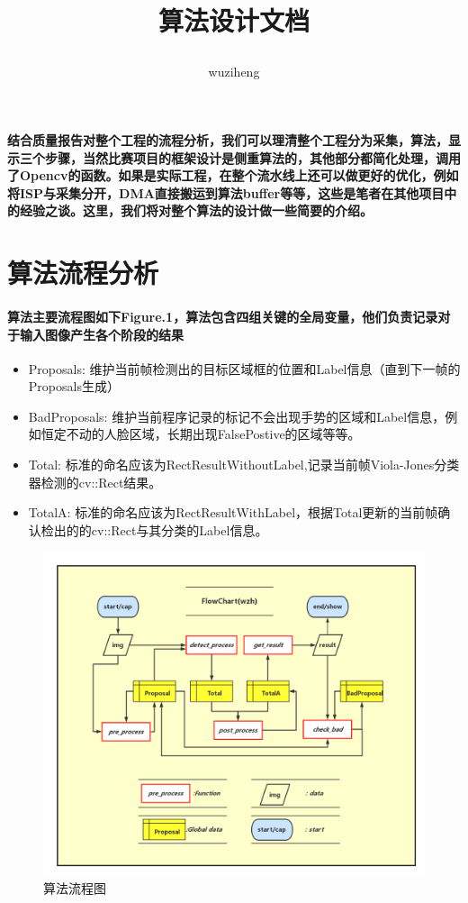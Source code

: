 \documentclass{article}
\title{\begin{huge}
算法设计文档
\end{huge}}
\author{wuziheng}
\begin{document}
\maketitle
\paragraph{结合质量报告对整个工程的流程分析，我们可以理清整个工程分为采集，算法，显示三个步骤，当然比赛项目的框架设计是侧重算法的，其他部分都简化处理，调用了Opencv的函数。如果是实际工程，在整个流水线上还可以做更好的优化，例如将ISP与采集分开，DMA直接搬运到算法buffer等等，这些是笔者在其他项目中的经验之谈。这里，我们将对整个算法的设计做一些简要的介绍。}

\section{算法流程分析}
\paragraph{算法主要流程图如下Figure.1，算法包含四组关键的全局变量，他们负责记录对于输入图像产生各个阶段的结果}

	\begin{itemize}[leftmargin=*]
	\item[]Proposals: 维护当前帧检测出的目标区域框的位置和Label信息（直到下一帧的Proposals生成）
	\item[]BadProposals: 维护当前程序记录的标记不会出现手势的区域和Label信息，例如恒定不动的人脸区域，长期出现FalsePostive的区域等等。
	\item[]Total: 标准的命名应该为RectResultWithoutLabel,记录当前帧Viola-Jones分类器检测的cv::Rect结果。
	\item[]TotalA: 标准的命名应该为RectResultWithLabel，根据Total更新的当前帧确认检出的的cv::Rect与其分类的Label信息。
	\end{itemize}
	
	\begin{figure}[htb]
	\centering
	\centerline{\includegraphics[scale=0.3]{pic/flow.png}}
	\caption{算法流程图}
	\label{fig:label}
	\end{figure}
\end{document}

